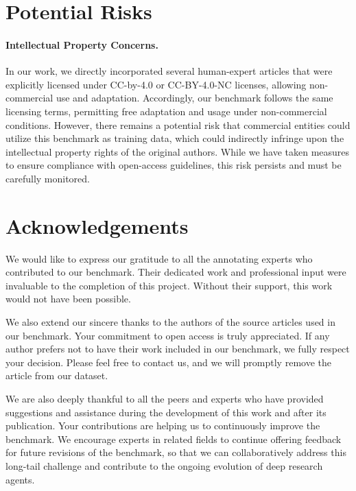 \documentclass[11pt]{article}
\begin{document}
\section{Potential Risks}

\paragraph{Intellectual Property Concerns.} In our work, we directly incorporated several human-expert articles that were explicitly licensed under CC-by-4.0 or CC-BY-4.0-NC licenses, allowing non-commercial use and adaptation. Accordingly, our benchmark follows the same licensing terms, permitting free adaptation and usage under non-commercial conditions. However, there remains a potential risk that commercial entities could utilize this benchmark as training data, which could indirectly infringe upon the intellectual property rights of the original authors. While we have taken measures to ensure compliance with open-access guidelines, this risk persists and must be carefully monitored.

\section{Acknowledgements}

We would like to express our gratitude to all the annotating experts who contributed to our benchmark. Their dedicated work and professional input were invaluable to the completion of this project. Without their support, this work would not have been possible.

We also extend our sincere thanks to the authors of the source articles used in our benchmark. Your commitment to open access is truly appreciated. If any author prefers not to have their work included in our benchmark, we fully respect your decision. Please feel free to contact us, and we will promptly remove the article from our dataset.

We are also deeply thankful to all the peers and experts who have provided suggestions and assistance during the development of this work and after its publication. Your contributions are helping us to continuously improve the benchmark. We encourage experts in related fields to continue offering feedback for future revisions of the benchmark, so that we can collaboratively address this long-tail challenge and contribute to the ongoing evolution of deep research agents.



%


\end{document}
